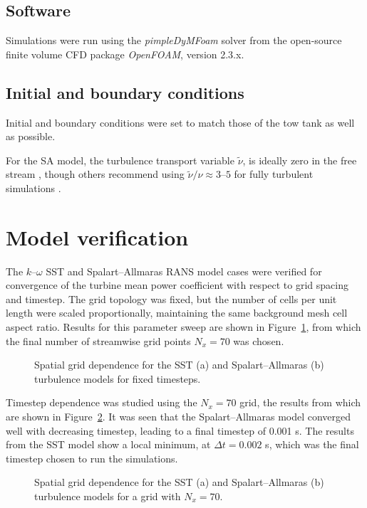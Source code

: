 \documentclass[aip,graphicx]{revtex4-1}
\begin{document}
\subsection{Software}

Simulations were run using the \textit{pimpleDyMFoam} solver from the
open-source finite volume CFD package \textit{OpenFOAM}, version 2.3.x.

\subsection{Initial and boundary conditions}

Initial and boundary conditions were set to match those of the tow tank as well
as possible. 

For the SA model, the turbulence transport variable $\tilde{\nu}$, is ideally
zero in the free stream \cite{Spalart1992}, though others recommend using
$\tilde{\nu}/\nu \approx 3$--$5$ for fully turbulent simulations
\cite{Spalart2007}.

\section{Model verification}

The $k$--$\omega$ SST and Spalart--Allmaras RANS model cases were verified for
convergence of the turbine mean power coefficient with respect to grid spacing
and timestep. The grid topology was fixed, but the number of cells per unit
length were scaled proportionally, maintaining the same background mesh cell
aspect ratio. Results for this parameter sweep are shown in 
Figure~\ref{fig:spatial-grid-dep}, from which the final number of streamwise
grid points $N_x = 70$ was chosen.

\begin{figure}[ht]
\caption{Spatial grid dependence for the SST (a) and Spalart--Allmaras (b) 
turbulence models for fixed timesteps.}
\label{fig:spatial-grid-dep}
\end{figure}

Timestep dependence was studied using the $N_x=70$ grid, the results from which
are shown in Figure~\ref{fig:timestep-dep}. It was seen that the
Spalart--Allmaras model converged well with decreasing timestep, leading to a
final timestep of 0.001 s. The results from the SST model show a local minimum,
at $\Delta t = 0.002$ s, which was the final timestep chosen to run the
simulations.

\begin{figure}[ht]
\caption{Spatial grid dependence for the SST (a) and Spalart--Allmaras (b) 
turbulence models for a grid with $N_x=70$.}
\label{fig:timestep-dep}
\end{figure}
\end{document}
